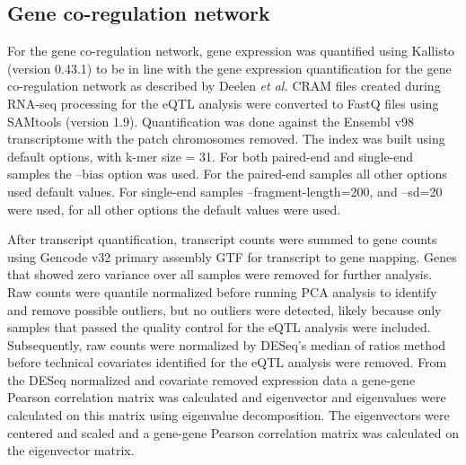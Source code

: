 \subsection{Gene co-regulation network}
For the gene co-regulation network, gene expression was quantified using Kallisto\cite{brayNearoptimalProbabilisticRNAseq2016} (version 0.43.1) to be in line with the gene expression quantification for the gene co-regulation network as described by Deelen \emph{et al.}\cite{deelenImprovingDiagnosticYield2019}  CRAM files created during RNA-seq processing for the eQTL analysis were converted to FastQ files using SAMtools\cite{liSequenceAlignmentMap2009} (version 1.9). Quantification was done against the Ensembl\cite{cunninghamEnsembl20192019} v98 transcriptome with the patch chromosomes removed. The index was built using default options, with k-mer size = 31. For both paired-end and single-end samples the –bias option was used. For the paired-end samples all other options used default values. For single-end samples –fragment-length=200, and –sd=20 were used, for all other options the default values were used. 

After transcript quantification, transcript counts were summed to gene counts using Gencode\cite{frankishGENCODEReferenceAnnotation2019} v32 primary assembly GTF for transcript to gene mapping.  Genes that showed zero variance over all samples were removed for further analysis. Raw counts were quantile normalized before running PCA analysis to identify and remove possible outliers, but no outliers were detected, likely because only samples that passed the quality control for the eQTL analysis were included. Subsequently, raw counts were normalized by DESeq’s\cite{loveModeratedEstimationFold2014} median of ratios method before technical covariates identified for the eQTL analysis were removed. From the DESeq\cite{loveModeratedEstimationFold2014} normalized and covariate removed expression data a gene-gene Pearson correlation matrix was calculated and eigenvector and eigenvalues were calculated on this matrix using eigenvalue decomposition. The eigenvectors were centered and scaled and a gene-gene Pearson correlation matrix was calculated on the eigenvector matrix. 

